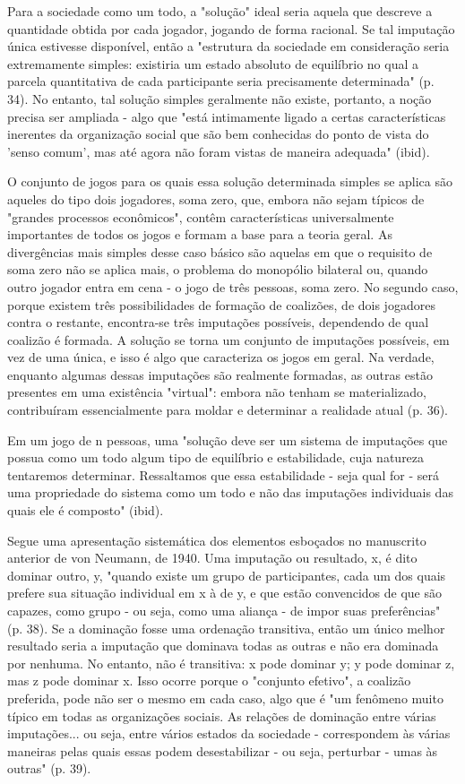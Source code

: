 \documentclass[a4paper,12pt]{article}[abntex2]
\begin{document}
Para a sociedade como um todo, a "solução" ideal seria aquela que descreve a quantidade obtida por cada jogador, jogando de forma racional. Se tal imputação única estivesse disponível, então a "estrutura da sociedade em consideração seria extremamente simples: existiria um estado absoluto de equilíbrio no qual a parcela quantitativa de cada participante seria precisamente determinada" (p. 34). No entanto, tal solução simples geralmente não existe, portanto, a noção precisa ser ampliada - algo que "está intimamente ligado a certas características inerentes da organização social que são bem conhecidas do ponto de vista do 'senso comum', mas até agora não foram vistas de maneira adequada" (ibid).

O conjunto de jogos para os quais essa solução determinada simples se aplica são aqueles do tipo dois jogadores, soma zero, que, embora não sejam típicos de "grandes processos econômicos", contêm características universalmente importantes de todos os jogos e formam a base para a teoria geral. As divergências mais simples desse caso básico são aquelas em que o requisito de soma zero não se aplica mais, o problema do monopólio bilateral ou, quando outro jogador entra em cena - o jogo de três pessoas, soma zero. No segundo caso, porque existem três possibilidades de formação de coalizões, de dois jogadores contra o restante, encontra-se três imputações possíveis, dependendo de qual coalizão é formada. A solução se torna um conjunto de imputações possíveis, em vez de uma única, e isso é algo que caracteriza os jogos em geral. Na verdade, enquanto algumas dessas imputações são realmente formadas, as outras estão presentes em uma existência "virtual": embora não tenham se materializado, contribuíram essencialmente para moldar e determinar a realidade atual (p. 36).

Em um jogo de n pessoas, uma "solução deve ser um sistema de imputações que possua como um todo algum tipo de equilíbrio e estabilidade, cuja natureza tentaremos determinar. Ressaltamos que essa estabilidade - seja qual for - será uma propriedade do sistema como um todo e não das imputações individuais das quais ele é composto" (ibid).

Segue uma apresentação sistemática dos elementos esboçados no manuscrito anterior de von Neumann, de 1940. Uma imputação ou resultado, x, é dito dominar outro, y, "quando existe um grupo de participantes, cada um dos quais prefere sua situação individual em x à de y, e que estão convencidos de que são capazes, como grupo - ou seja, como uma aliança - de impor suas preferências" (p. 38). Se a dominação fosse uma ordenação transitiva, então um único melhor resultado seria a imputação que dominava todas as outras e não era dominada por nenhuma. No entanto, não é transitiva: x pode dominar y; y pode dominar z, mas z pode dominar x. Isso ocorre porque o "conjunto efetivo", a coalizão preferida, pode não ser o mesmo em cada caso, algo que é "um fenômeno muito típico em todas as organizações sociais. As relações de dominação entre várias imputações... ou seja, entre vários estados da sociedade - correspondem às várias maneiras pelas quais essas podem desestabilizar - ou seja, perturbar - umas às outras" (p. 39).
\end{document}
